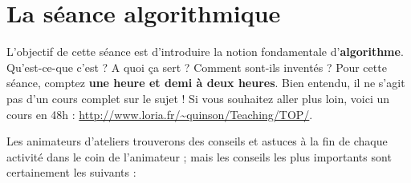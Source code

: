 \documentclass[a5paper,pagesize,DIV=14]{scrbook}
\begin{document}

\section*{La séance algorithmique}

L'objectif de cette séance est d'introduire la notion fondamentale d'\textbf{al\-gorithme}. Qu'est-ce-que c'est ? A quoi ça sert ? Comment sont-ils inventés ? Pour cette séance, comptez \textbf{une heure et demi à deux heures}. Bien entendu, il ne s'agit pas d'un cours complet sur le sujet ! Si vous souhaitez aller plus loin, voici un cours en 48h : \url{http://www.loria.fr/~quinson/Teaching/TOP/}.

Les animateurs d'ateliers trouverons des conseils et astuces à la fin de chaque activité dans \og le coin de l'animateur \fg ; mais les conseils les plus importants sont certainement les suivants :
\end{document}
